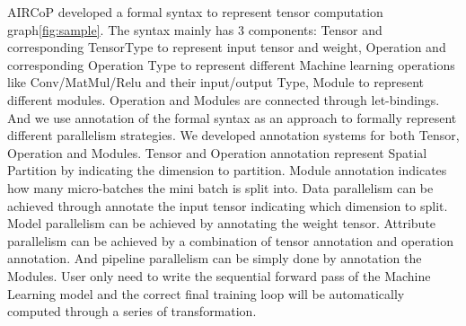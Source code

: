 \documentclass[sigplan]{acmart}\settopmatter{printfolios=true,printccs=false,printacmref=false}
\begin{document}
 AIRCoP developed a formal syntax to represent tensor computation graph\ref{fig:sample}. The syntax mainly has 3 components: Tensor and corresponding TensorType to represent input tensor and weight, Operation and corresponding Operation Type to represent different Machine learning operations like Conv/MatMul/Relu and their input/output Type, Module to represent different modules. Operation and Modules are connected through let-bindings. And we use annotation of the formal syntax as an approach to formally represent different parallelism strategies. We developed annotation systems for both Tensor, Operation and Modules. Tensor and Operation annotation represent Spatial Partition by indicating the dimension to partition. Module annotation indicates how many micro-batches the mini batch is split into. Data parallelism can be achieved through annotate the input tensor indicating which dimension to split. Model parallelism can be achieved by annotating the weight tensor. Attribute parallelism can be achieved by a combination  of tensor annotation and operation annotation. And pipeline parallelism can be simply done by annotation the Modules. User only need to write the sequential forward pass of the Machine Learning model and the correct final training loop will be automatically computed through a series of transformation.
\end{document}
